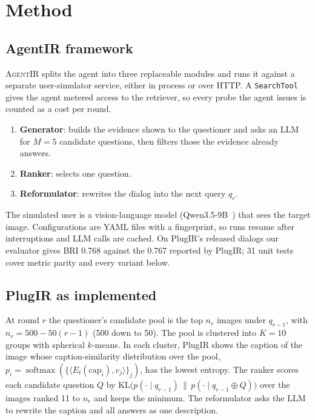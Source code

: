 \documentclass[sigconf,nonacm]{acmart}
\begin{document}
\section{Method}
\label{sec:method}
\subsection{AgentIR framework}
\textsc{AgentIR} splits the agent into three replaceable modules and runs it against a separate
user-simulator service, either in process or over HTTP. A \texttt{SearchTool} gives the agent
metered access to the retriever, so every probe the agent issues is counted as a cost per round.
\begin{enumerate}
\item \textbf{Generator}: builds the evidence shown to the questioner and asks an LLM for $M=5$
  candidate questions, then filters those the evidence already answers.
\item \textbf{Ranker}: selects one question.
\item \textbf{Reformulator}: rewrites the dialog into the next query $q_r$.
\end{enumerate}
The simulated user is a vision-language model (Qwen3.5-9B~\cite{qwen35}) that sees the target
image. Configurations are YAML files with a fingerprint, so runs resume after interruptions and
LLM calls are cached. On PlugIR's released dialogs our evaluator gives BRI 0.768 against the
0.767 reported by PlugIR; 31 unit tests cover metric parity and every variant below.

\subsection{PlugIR as implemented}
At round $r$ the questioner's candidate pool is the top $n_r$ images under $q_{r-1}$, with
$n_r=500-50(r-1)$ (500 down to 50). The pool is clustered into $K=10$ groups with spherical
$k$-means. In each cluster, PlugIR shows the caption of the image whose caption-similarity
distribution over the pool, $p_i=\operatorname{softmax}(\{\langle E_t(\text{cap}_i),v_j\rangle\}_j)$,
has the lowest entropy. The ranker scores each candidate question $Q$ by
$\mathrm{KL}\big(p(\cdot\mid q_{r-1})\,\|\,p(\cdot\mid q_{r-1}\oplus Q)\big)$ over the images
ranked 11 to $n_r$ and keeps the minimum. The reformulator asks the LLM to rewrite the caption and
all answers as one description.
\end{document}
